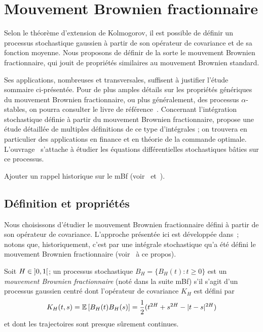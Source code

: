 \section{Mouvement Brownien fractionnaire}

Selon le théorème d'extension de Kolmogorov, il est possible de
définir un processus stochastique gaussien à partir de son opérateur
de covariance et de sa fonction moyenne. Nous proposons de définir de
la sorte le mouvement Brownien fractionnaire, qui jouit de propriétés
similaires au mouvement Brownien standard.

Ses applications, nombreuses et transversales, suffisent à justifier
l'étude sommaire ci-présentée. Pour de plus amples détails sur les
propriétés génériques du mouvement Brownien fractionnaire, ou plus
généralement, des processus $\alpha$-stables, on pourra consulter le
livre de référence~\cite{samorodnitsky1994}. Concernant l'intégration
stochastique définie à partir du mouvement Brownien fractionnaire,
\cite{biagini2008} propose une étude détaillée de multiples
définitions de ce type d'intégrales ; on trouvera en particulier des
applications en finance et en théorie de la commande
optimale. L'ouvrage~\cite{mishura2008} s'attache à étudier les
équations différentielles stochastiques bâties sur ce processus.

\begin{alert}
  Ajouter un rappel historique sur le mBf
  (voir~\cite[p.~6]{biagini2008} et~\cite{mandelbrot1968}).
\end{alert}
\subsection{Définition et propriétés}

Nous choisissons d'étudier le mouvement Brownien fractionnaire défini
à partir de son opérateur de covariance. L'approche présentée ici est
développée dans~\cite{ayache2018}; notons que, historiquement, c'est
par une intégrale stochastique qu'a été défini le mouvement Brownien
fractionnaire (voir~\cite{mandelbrot1968} à ce propos).

\begin{definition}\label{def:mBf}
  Soit $H\in\left]0,1\right[$; un processus stochastique
  $B_H = \{B_H(t) : t\geq 0\}$ est un \emph{mouvement Brownien
    fractionnaire} (noté dans
  la suite \og{}mBf\fg{}) s'il s'agit d'un processus gaussien centré
  dont l'opérateur de covariance $K_H$ est défini par
  \[ K_H(t,s) = \mathbb{E}\left[B_H(t)B_H(s)\right] = \frac{1}{2}(t^{2H} + s^{2H} -
    |t-s|^{2H}) \]
  et dont les trajectoires sont presque sûrement continues.
\end{definition}

